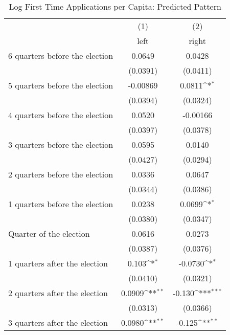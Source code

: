 \begin{table}[htbp]\centering
\def\sym#1{\ifmmode^{#1}\else\(^{#1}\)\fi}
\caption{Log First Time Applications per Capita: Predicted Pattern}
\begin{tabular}{l*{2}{c}}
\hline\hline
                    &\multicolumn{1}{c}{(1)}&\multicolumn{1}{c}{(2)}\\
                    &\multicolumn{1}{c}{left}&\multicolumn{1}{c}{right}\\
\hline
 6 quarters before the election&      0.0649         &      0.0428         \\
                    &    (0.0391)         &    (0.0411)         \\
[1em]
 5 quarters before the election&    -0.00869         &      0.0811\sym{*}  \\
                    &    (0.0394)         &    (0.0324)         \\
[1em]
 4 quarters before the election&      0.0520         &    -0.00166         \\
                    &    (0.0397)         &    (0.0378)         \\
[1em]
 3 quarters before the election&      0.0595         &      0.0140         \\
                    &    (0.0427)         &    (0.0294)         \\
[1em]
 2 quarters before the election&      0.0336         &      0.0647         \\
                    &    (0.0344)         &    (0.0386)         \\
[1em]
 1 quarters before the election&      0.0238         &      0.0699\sym{*}  \\
                    &    (0.0380)         &    (0.0347)         \\
[1em]
Quarter of the election&      0.0616         &      0.0273         \\
                    &    (0.0387)         &    (0.0376)         \\
[1em]
 1 quarters after the election&       0.103\sym{*}  &     -0.0730\sym{*}  \\
                    &    (0.0410)         &    (0.0321)         \\
[1em]
 2 quarters after the election&      0.0909\sym{**} &      -0.130\sym{***}\\
                    &    (0.0313)         &    (0.0366)         \\
[1em]
 3 quarters after the election&      0.0980\sym{**} &      -0.125\sym{**} \\

\end{tabular}
\end{table}

